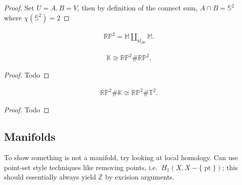 \begin{proof}

Set \(U= A, B=V\), then by definition of the connect sum,
\(A\cap B = {\mathbb{S}}^2\) where \(\chi({\mathbb{S}}^2) = 2\)

\end{proof}

\begin{proposition}[Decomposing $\RP^2$]

\begin{align*}  
{\mathbb{RP}}^2 = {\mathbb{M}}{\coprod}_{\operatorname{id}_{{{\partial}}{\mathbb{M}}}} {\mathbb{M}}
.\end{align*}

\end{proposition}

\begin{proposition}

\begin{align*}  
{\mathbb{K}}\cong {\mathbb{RP}}^2 \# {\mathbb{RP}}^2
.\end{align*}

\end{proposition}

\begin{proof}

Todo

\end{proof}


\begin{proposition}

\begin{align*}  
{\mathbb{RP}}^2 \# {\mathbb{K}}\cong {\mathbb{RP}}^2 \# {\mathbb{T}}^2
.\end{align*}

\end{proposition}

\begin{proof}

Todo

\end{proof}


\hypertarget{manifolds}{%
\subsection{Manifolds}\label{manifolds}}

\begin{remark}

To show something is not a manifold, try looking at local homology. Can
use point-set style techniques like removing points,
i.e.~\(H_1(X, X-{\{\operatorname{pt}\}})\); this should essentially
always yield \({\mathbb{Z}}\) by excision arguments.

\end{remark}

